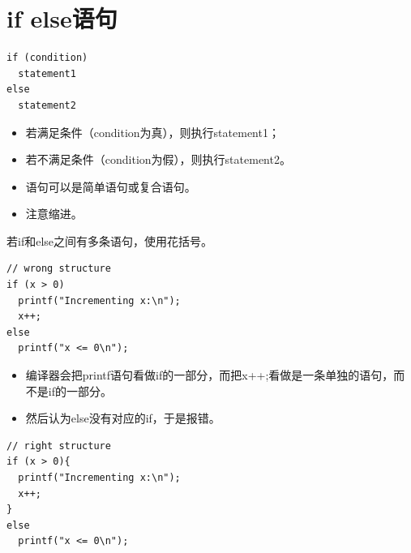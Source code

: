 \section{if else语句}

\begin{frame}[fragile]\ft{\secname}
\begin{lstlisting}
if (condition)
  statement1
else
  statement2
\end{lstlisting} \pause 
\begin{itemize}
\item  若满足条件（condition为真），则执行statement1；
\item[]若不满足条件（condition为假），则执行statement2。\\[0.1in]
\item 语句可以是简单语句或复合语句。\\[0.1in]
\item 注意缩进。
\end{itemize}
\end{frame}

\begin{frame}[fragile]\ft{\secname}
若if和else之间有多条语句，使用花括号。
\begin{lstlisting}
// wrong structure
if (x > 0)
  printf("Incrementing x:\n");
  x++;
else
  printf("x <= 0\n");
\end{lstlisting}\pause
\begin{itemize}
\item  编译器会把printf语句看做if的一部分，而把x++;看做是一条单独的语句，而不是if的一部分。\\[0.1in]
\item 然后认为else没有对应的if，于是报错。
\end{itemize}
\end{frame}

\begin{frame}[fragile]\ft{\secname}
\begin{lstlisting}
// right structure
if (x > 0){
  printf("Incrementing x:\n");
  x++;
}	
else
  printf("x <= 0\n");
\end{lstlisting}
\end{frame}



